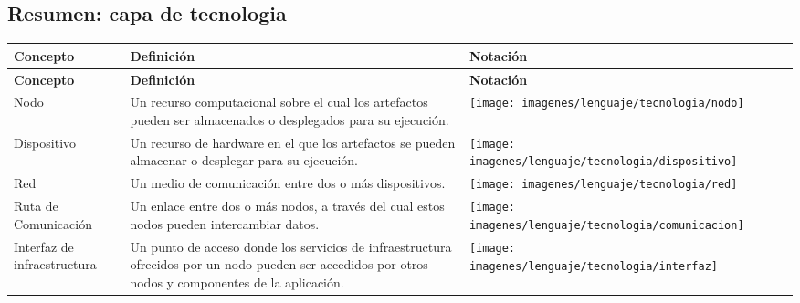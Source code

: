 \subsection{Resumen: capa de tecnologia}
\begin{center}
\begin{longtable}{| >{\centering\arraybackslash}m{3cm} | >{\arraybackslash}m{6cm} | p{4cm} | p{5cm} | p{4cm} |}
	
		\hline
		\textbf{Concepto} &  \centering \textbf{Definición} & \textbf{Notación} \\
		\hline
		\endfirsthead
		
		
		\hline
		\textbf{Concepto} &  \centering \textbf{Definición} & \textbf{Notación} \\
		\hline
		\endhead
		
		Nodo & 
		\vspace{1mm} Un recurso computacional sobre el cual los artefactos pueden ser almacenados o	desplegados para su ejecución.&
		\texttt{[image: imagenes/lenguaje/tecnologia/nodo]}\\ 
		\hline
		
		Dispositivo & 
		\vspace{1mm} 
		Un recurso de hardware en el que los	artefactos se pueden almacenar o desplegar 	para su ejecución.& 
		\texttt{[image: imagenes/lenguaje/tecnologia/dispositivo]}\\ 
		\hline
		
		Red &
		\vspace{1mm} Un medio de comunicación entre dos o más dispositivos.& 
		\texttt{[image: imagenes/lenguaje/tecnologia/red]}\\ 
		\hline
		
		Ruta de Comunicación & 
		\vspace{1mm} Un enlace entre dos o más nodos, a	través del cual estos nodos pueden intercambiar datos.& 
		\texttt{[image: imagenes/lenguaje/tecnologia/comunicacion]}  \\ 
		\hline
		
		Interfaz de infraestructura &
		\vspace{1mm} Un punto de acceso donde los servicios de infraestructura ofrecidos por un nodo pueden ser accedidos por otros nodos y componentes de la aplicación.&  
		\texttt{[image: imagenes/lenguaje/tecnologia/interfaz]}  \\ 
		\hline
		

\end{longtable}
\end{center}
